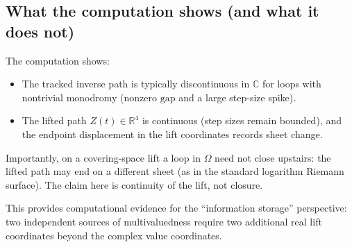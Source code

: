 \subsection{What the computation shows (and what it does not)}
The computation shows:
\begin{itemize}
\item The tracked inverse path is typically discontinuous in $\mathbb{C}$
for loops with nontrivial monodromy (nonzero $\mathrm{gap}$ and a large
step-size spike).
\item The lifted path $Z(t)\in\mathbb{R}^4$ is continuous (step sizes remain bounded),
and the endpoint displacement in the lift coordinates records sheet change.
\end{itemize}

Importantly, on a covering-space lift a loop in $\Omega$ need not close upstairs:
the lifted path may end on a different sheet (as in the standard logarithm
Riemann surface). The claim here is continuity of the lift, not closure.

This provides computational evidence for the ``information storage'' perspective:
two independent sources of multivaluedness require two additional real lift
coordinates beyond the complex value coordinates.
